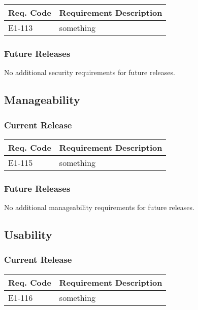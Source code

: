 \documentclass[12pt]{article}
\begin{document}
\begin{table}[!h]
	\begin{tabular}{| l | l |}
		\hline
		\textbf{Req. Code} & \textbf{Requirement Description}\\
		\hline
		E1-113	& something\\
		\hline
	\end{tabular}
	\label{tab:SecurityRequirements}
\end{table}

\subsubsection{Future Releases}
No additional security requirements for future releases.


\subsection{Manageability}

\subsubsection{Current Release}

\begin{table}[!h]
	\begin{tabular}{| l | l |}
		\hline
		\textbf{Req. Code} & \textbf{Requirement Description}\\
		\hline
		E1-115	& something\\
		\hline
	\end{tabular}
	\label{tab:ManageabilityRequirements}
\end{table}

\subsubsection{Future Releases}
No additional manageability requirements for future releases.


\subsection{Usability}

\subsubsection{Current Release}

\begin{table}[!h]
	\begin{tabular}{| l | l |}
		\hline
		\textbf{Req. Code} & \textbf{Requirement Description}\\
		\hline
		E1-116	& something\\
		\hline
	\end{tabular}
	\label{tab:UsabilityRequirements}
\end{table}
\end{document}
